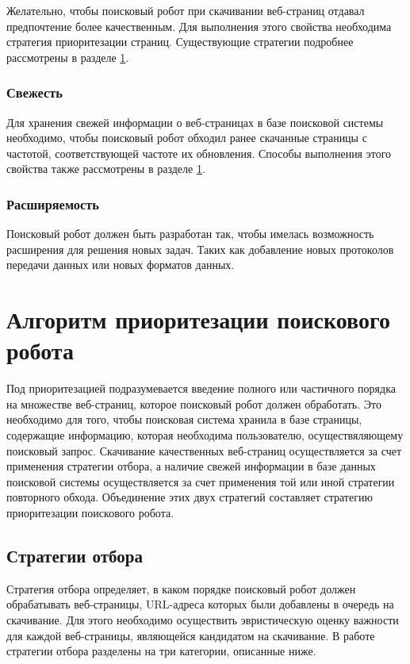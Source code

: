 Желательно, чтобы поисковый робот при скачивании веб-страниц отдавал предпочтение более качественным. Для выполнения этого свойства необходима стратегия приоритезации страниц. Существующие стратегии подробнее рассмотрены в разделе \ref{algorithms}.

\subsubsection*{Свежесть}

Для хранения свежей информации о веб-страницах в базе поисковой системы необходимо, чтобы поисковый робот обходил ранее скачанные страницы с частотой, соответствующей частоте их обновления. Способы выполнения этого свойства также рассмотрены в разделе \ref{algorithms}.

\subsubsection*{Расширяемость}

Поисковый робот должен быть разработан так, чтобы имелась возможность расширения для решения новых задач. Таких как добавление новых протоколов передачи данных или новых форматов данных. 

\section{Алгоритм приоритезации поискового робота}
\label{algorithms}

Под приоритезацией подразумевается введение полного или частичного порядка на множестве веб-страниц, которое поисковый робот должен обработать. Это необходимо для того, чтобы поисковая система хранила в базе страницы, содержащие информацию, которая необходима пользователю, осуществяляющему поисковый запрос. Скачивание качественных веб-страниц осуществляется за счет применения стратегии отбора, а наличие свежей информации в базе данных поисковой системы осуществляется за счет применения той или иной стратегии повторного обхода. Объединение этих двух стратегий составляет стратегию приоритезации поискового робота. 

\subsection{Стратегии отбора}
\label{selection_strategy}

Стратегия отбора определяет, в каком порядке поисковый робот должен обрабатывать веб-страницы, URL-адреса которых были добавлены в очередь на скачивание. Для этого необходимо осуществить эвристическую оценку важности для каждой веб-страницы, являющейся кандидатом на скачивание. В работе \cite{Castillo} стратегии отбора разделены на три категории, описанные ниже.

